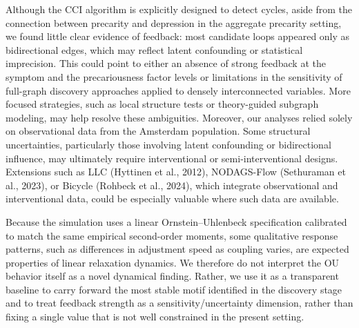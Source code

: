\documentclass[
]{article}
\begin{document}
Although the CCI algorithm is explicitly designed to detect cycles,
aside from the connection between precarity and depression in the
aggregate precarity setting, we found little clear evidence of feedback:
most candidate loops appeared only as bidirectional edges, which may
reflect latent confounding or statistical imprecision. This could point
to either an absence of strong feedback at the symptom and the
precariousness factor levels or limitations in the sensitivity of
full-graph discovery approaches applied to densely interconnected
variables. More focused strategies, such as local structure tests or
theory-guided subgraph modeling, may help resolve these ambiguities.
Moreover, our analyses relied solely on observational data from the
Amsterdam population. Some structural uncertainties, particularly those
involving latent confounding or bidirectional influence, may ultimately
require interventional or semi-interventional designs. Extensions such
as LLC (Hyttinen et al., 2012), NODAGS-Flow (Sethuraman et al., 2023),
or Bicycle (Rohbeck et al., 2024), which integrate observational and
interventional data, could be especially valuable where such data are
available.

Because the simulation uses a linear Ornstein--Uhlenbeck specification
calibrated to match the same empirical second-order moments, some
qualitative response patterns, such as differences in adjustment speed
as coupling varies, are expected properties of linear relaxation
dynamics. We therefore do not interpret the OU behavior itself as a
novel dynamical finding. Rather, we use it as a transparent baseline to
carry forward the most stable motif identified in the discovery stage
and to treat feedback strength as a sensitivity/uncertainty dimension,
rather than fixing a single value that is not well constrained in the
present setting.
\end{document}
